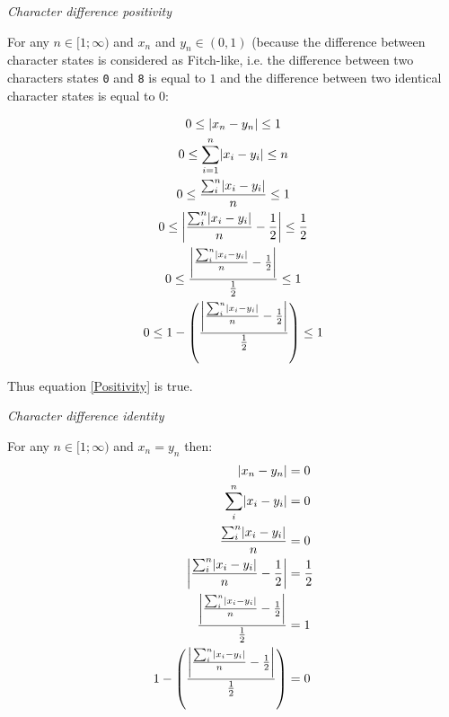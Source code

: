 \documentclass[12pt,letterpaper]{article}
\DeclarePairedDelimiter\abs{\lvert}{\rvert}%
\renewcommand{\subsection}[1]{%
\bigskip
\begin{center}
\begin{large}
\normalfont\itshape #1
\end{large}
\end{center}}
\begin{document}
\subsection{Character difference positivity}

For any $n \in [1;\infty)$ and $x_{n}$ and $y_{n} \in (0,1)$ (because the difference between character states is considered as Fitch-like, i.e. the difference between two characters states \texttt{0} and \texttt{8} is equal to $1$ and the difference between two identical character states is equal to $0$:

\begin{equation}
    \label{positive_demo}
    \begin{gathered}
    0 \leq  \abs{x_{n}-y_{n}} \leq 1\\
    0 \leq  \sum_{i=1}^{n}\abs{x_{i}-y_{i}} \leq n\\
    0 \leq  \frac{\sum_{i}^{n}\abs{x_{i}-y_{i}}}{n} \leq 1\\
    0 \leq  \abs*{\frac{\sum_{i}^{n}\abs{x_{i}-y_{i}}}{n}-\frac{1}{2}} \leq \frac{1}{2}\\
    0 \leq  \frac{\abs*{\frac{\sum_{i}^{n}\abs{x_{i}-y_{i}}}{n}-\frac{1}{2}}}{\frac{1}{2}} \leq 1\\
    0 \leq  1 - \left(\frac{\abs*{\frac{\sum_{i}^{n}\abs{x_{i}-y_{i}}}{n}-\frac{1}{2}}}{\frac{1}{2}}\right) \leq 1\\
    \end{gathered}
\end{equation}

Thus equation \ref{Positivity} is true.

\subsection{Character difference identity}

For any $n \in [1;\infty)$ and $x_{n} = y_{n}$ then:
\begin{equation}
    \label{identitydemo}
    \begin{aligned}
    \abs{x_{n}-y_{n}} &= 0\\
    \sum_{i}^{n}\abs{x_{i}-y_{i}} &= 0\\
    \frac{\sum_{i}^{n}\abs{x_{i}-y_{i}}}{n} &= 0\\
    \abs*{\frac{\sum_{i}^{n}\abs{x_{i}-y_{i}}}{n}-\frac{1}{2}} &= \frac{1}{2}\\
    \frac{\abs*{\frac{\sum_{i}^{n}\abs{x_{i}-y_{i}}}{n}-\frac{1}{2}}}{\frac{1}{2}} &= 1\\
    1 - \left(\frac{\abs*{\frac{\sum_{i}^{n}\abs{x_{i}-y_{i}}}{n}-\frac{1}{2}}}{\frac{1}{2}}\right) &= 0\\
    \end{aligned}
\end{equation}
\end{document}
